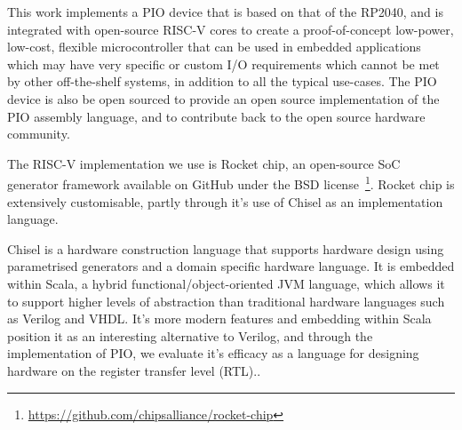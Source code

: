 This work implements a PIO device that is based on that of the RP2040, and is integrated with open-source RISC-V cores to create a proof-of-concept low-power, low-cost, flexible microcontroller that can be used in embedded applications which may have very specific or custom I/O requirements which cannot be met by other off-the-shelf systems, in addition to all the typical use-cases. The PIO device is also be open sourced to provide an open source implementation of the PIO assembly language, and to contribute back to the open source hardware community.

The RISC-V implementation we use is Rocket chip, an open-source SoC generator framework available on GitHub under the BSD license~\footnote{\url{https://github.com/chipsalliance/rocket-chip}}. Rocket chip is extensively customisable, partly through it's use of Chisel as an implementation language.

Chisel is a hardware construction language that supports hardware design using parametrised generators and a domain specific hardware language. It is embedded within Scala, a hybrid functional/object-oriented JVM language, which allows it to support higher levels of abstraction than traditional hardware languages such as Verilog and VHDL. It's more modern features and embedding within Scala position it as an interesting alternative to Verilog, and through the implementation of PIO, we evaluate it's efficacy as a language for designing hardware on the register transfer level (RTL).\cite{chisel}.